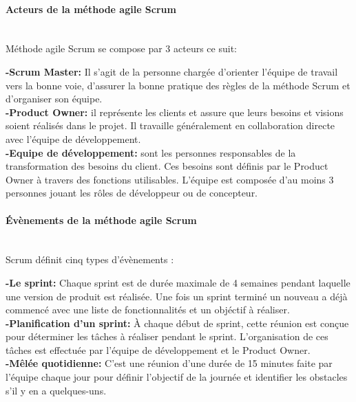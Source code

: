 \paragraph{\selectfont\Large    Acteurs de la méthode agile Scrum}
\texttt{}\\[0.2cm]

Méthode agile Scrum se compose par 3  acteurs ce suit:
\par \noindent \textbf{\Large -Scrum Master: } Il s'agit de la personne chargée d'orienter l'équipe de travail vers la bonne voie, d'assurer la bonne pratique des règles de la méthode Scrum et d'organiser son équipe. \\[0.1cm]

\noindent \textbf{\Large -Product Owner: } il représente les clients et assure que leurs besoins et visions soient réalisés dans le projet. Il travaille généralement en collaboration directe avec l’équipe de développement. \\[0.1cm]

\noindent \textbf{\Large -Equipe de développement: }sont les personnes responsables de la transformation des besoins du client. Ces besoins sont définis par le Product Owner à travers des fonctions utilisables. L'équipe est composée d'au moins 3 personnes jouant les rôles de développeur ou de concepteur.\\[0.1cm]
\paragraph{\selectfont\Large Évènements de la méthode agile Scrum }
\texttt{}\\[0.2cm]
 Scrum définit cinq types d'évènements :\\[0.1cm]%
\par \noindent \textbf{\Large -Le sprint: }Chaque sprint est de durée maximale de 4 semaines pendant laquelle une version de produit est réalisée. Une fois un sprint terminé un nouveau a déjà commencé avec une liste de fonctionnalités et un objéctif à réaliser. \\[0.1cm]

\noindent \textbf{\Large -Planification d’un sprint: }À chaque début de sprint, cette réunion est conçue pour déterminer les tâches à réaliser pendant le sprint. L’organisation de ces tâches est effectuée par l’équipe de développement et le Product Owner. \\[0.1cm]

\noindent \textbf{\Large -Mêlée quotidienne: } C'est une réunion d'une durée de 15 minutes faite par l’équipe chaque jour pour définir l’objectif de la journée et identifier les obstacles s’il y en a quelques-uns.\\[0.1cm]

